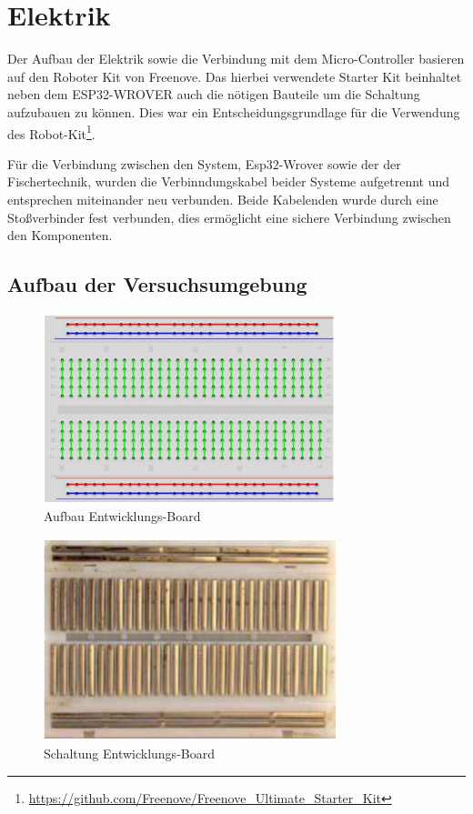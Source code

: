 \documentclass[conference,compsoc,final,a4paper]{IEEEtran}
\begin{document}
\section{Elektrik}
Der Aufbau der Elektrik sowie die Verbindung mit dem Micro-Controller basieren auf den Roboter Kit von Freenove. 
Das hierbei verwendete Starter Kit beinhaltet neben dem ESP32-WROVER auch die nötigen Bauteile um die Schaltung aufzubauen zu können. 
Dies war ein Entscheidungsgrundlage für die Verwendung des Robot-Kit\footnote{\url{https://github.com/Freenove/Freenove\_Ultimate\_Starter\_Kit}}.

Für die Verbindung zwischen den System, Esp32-Wrover sowie der der Fischertechnik, wurden die Verbinndungskabel beider Systeme aufgetrennt und entsprechen miteinander neu verbunden.
Beide Kabelenden wurde durch eine Stoßverbinder fest verbunden, dies ermöglicht eine sichere Verbindung zwischen den Komponenten.

\subsection{Aufbau der Versuchsumgebung}
\begin{figure}[h]
\centering
\includegraphics[width=8.5cm]{../images/board.png}
\caption{Aufbau Entwicklungs-Board \autocite{freenoveTutorial}}\label{Elektrik:DevBoard}
\end{figure}

\begin{figure}[h]
\centering
\includegraphics[width=8.5cm]{../images/board2.png}
\caption{Schaltung Entwicklungs-Board \autocite{freenoveTutorial}}\label{Elektrik:DevBoardInternal}
\end{figure}
\end{document}
